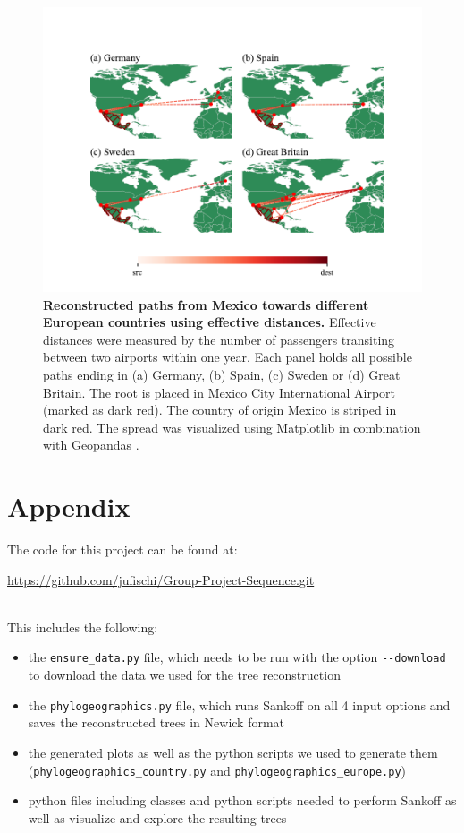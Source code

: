 \documentclass{article}
\begin{document}
\begin{figure}[h!]
    \centering
    \includegraphics[width=\linewidth,trim={0.5cm 0 0.5cm 0}]{airport_effective_europe.pdf}
    \caption{\textbf{Reconstructed paths from Mexico towards different European countries using effective distances.} Effective distances were measured by the number of passengers transiting between two airports within one year. Each panel holds all possible paths ending in (a) Germany, (b) Spain, (c) Sweden or (d) Great Britain. The root is placed in Mexico City International Airport (marked as dark red). The country of origin Mexico is striped in dark red. The spread was visualized using Matplotlib \cite{MatplotlibVisualizationPython} in combination with Geopandas \cite{GeoPandas12GeoPandas}.}%
    \label{fig:Europe}
\end{figure}

\newpage
  
 

\newpage
\appendix
\section*{Appendix}
The code for this project can be found at:

\url{https://github.com/jufischi/Group-Project-Sequence.git}

\ \\

This includes the following:
\begin{itemize}
    \item the \texttt{ensure\_data.py} file, which needs to be run with the option \texttt{-\texttt{-}download} to download the data we used for the tree reconstruction
    \item the \texttt{phylogeographics.py} file, which runs Sankoff on all 4 input options and saves the reconstructed trees in Newick format
    \item the generated plots as well as the python scripts we used to generate them (\texttt{phylogeographics\_country.py} and \texttt{phylogeographics\_europe.py})
    \item python files including classes and python scripts needed to perform Sankoff as well as visualize and explore the resulting trees
\end{itemize} 
\end{document}

